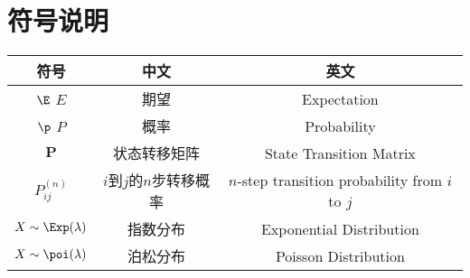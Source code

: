 \appendix
\clearpage
\section{符号说明}
\begin{table}[H]
	\centering
	\begin{tabular}{ccc}
		\toprule
		符号                    & 中文               & 英文                                              \\
		\midrule
		$\E$ $E$              & 期望               & Expectation                                     \\
		$\p$ $P$              & 概率               & Probability                                     \\
		$\bm{P}$              & 状态转移矩阵           & State Transition Matrix                         \\
		$P_{ij}^{(n)}$        & $i$到$j$的$n$步转移概率 & $n$-step transition probability from $i$ to $j$ \\
		$X\sim \Exp(\lambda)$ & 指数分布             & Exponential Distribution                        \\
		$X\sim \poi(\lambda)$ & 泊松分布             & Poisson Distribution                            \\
		\bottomrule
	\end{tabular}
\end{table}